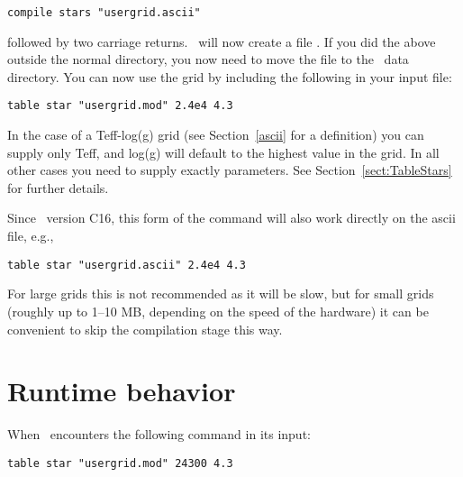 \begin{verbatim}
compile stars "usergrid.ascii"
\end{verbatim}

\noindent
followed by two carriage returns. \Cloudy\ will now create a file
. If you did the above outside the normal \Cloudy
directory, you now need to move the  file to the
\Cloudy\ data directory. You can now use the grid by including the following in
your input file:

\begin{verbatim}
table star "usergrid.mod" 2.4e4 4.3
\end{verbatim}

In the case of a Teff-log(g) grid (see Section~\ref{ascii} for a definition)
you can supply only Teff, and log(g) will default to the highest value in the
grid. In all other cases you need to supply exactly 
parameters. See Section~\ref{sect:TableStars} for further details.

Since \Cloudy\ version C16, this form of the  command
will also work directly on the ascii file, e.g.,

\begin{verbatim}
table star "usergrid.ascii" 2.4e4 4.3
\end{verbatim}

For large grids this is not recommended as it will be slow, but for small
grids (roughly up to 1--10 MB, depending on the speed of the hardware) it can
be convenient to skip the compilation stage this way.

\section{Runtime behavior}
\label{runtime}

When \Cloudy\ encounters the following command in its input:

\begin{verbatim}
table star "usergrid.mod" 24300 4.3
\end{verbatim}

